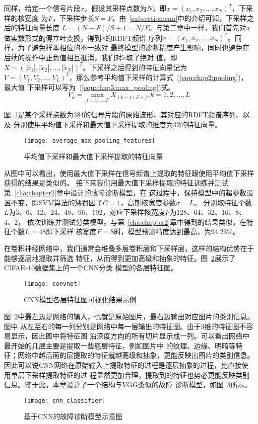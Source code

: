 同样，给定一个信号片段$x$，假设其采样点数为$N$，即$x = (x_1,x_2,...,x_N)^T$，下采样的核宽度
为$F$，下采样步长$S=F$。由~\ref{subsection:cnn}中的介绍可知，下采样之后的特征向量长度
$L = (N-F)/S+1=N/F$。与第二章中一样，我们首先对$x$做实数形式的傅立叶变换，得到$x$的RDFT频谱
序列$\widetilde{x} = (\widetilde{x}_1, \widetilde{x}_2, ..., \widetilde{x}_N)^T$。同样，为了避免样本相位的不一致对
最终模型的诊断精度产生影响，同时也避免在后续的操作中正负值相互抵消，我们对$\widetilde{x}$取了绝对
值，即$X = (|\widetilde{x}_1|, |\widetilde{x}_2|, ..., |\widetilde{x}_N|)^T$。下采样之后得到的特征向量记为
$V = (V_1, V_2, ..., V_L)^T$，那么参考平均值下采样的计算式~(\ref{equ:chap2:pooling})，最大值
下采样可以写为~(\ref{equ:chap3:max_pooling})式。
\begin{equation}
  \label{equ:chap3:max_pooling}
  V_k = \max_{j=1,...,F}X_{(k-1)F+j}, k=1,2,...,L
\end{equation}

图~\ref{fig:average_max_pooling_features}是某个采样点数为384的信号片段的原始波形、其对应的RDFT频谱序列、以及
分别使用平均值下采样和最大值下采样提取的维度为32的特征向量。
\begin{figure}[ht]
  \centering
  \texttt{[image: average\_max\_pooling\_features]}
  \caption{平均值下采样和最大值下采样提取的特征向量}
  \label{fig:average_max_pooling_features}
\end{figure}

从图中可以看出，使用最大值下采样在信号频谱上提取的特征跟使用平均值下采样获得的结果是类似的。
接下来我们用最大值下采样提取的特征训练并测试第~\ref{cha:chapter2}章中设计的故障诊断模型，在
这过程中，保持模型中的超参数设置不变，即SVM算法的惩罚因子$C=1$，高斯核宽度参数$\sigma=L$。
分别取特征个数$L$为3、6、12、24、48、96、192，对应下采样核宽度$F$为128、64、32、16、8、4、2，
依次训练并测试分类模型。与第~\ref{cha:chapter2}章中得到的结果类似，在特征个数$L=48$即下采样
核宽度$F=8$时，模型预测精度达到最高，为94.23\%。

在卷积神经网络中，我们通常会堆叠多层卷积层和下采样层，这样的结构优势在于能够逐层地提取并筛选
特征，从而得到更加高级和抽象的特征。图~\ref{fig:convnet}展示了CIFAR-10数据集上的一个CNN分类
模型的各层特征图。
\begin{figure}[ht]
  \centering%
  \texttt{[image: convnet]}
  \caption{CNN模型各层特征图可视化结果示例}
  \label{fig:convnet}
\end{figure}

图~\ref{fig:convnet}中最左边是网络的输入，也就是原始图片，最右边输出对应图片的类别信息。图中
从左至右的每一列分别是网络中每一层输出的特征图。由于3维的特征图不容易显示，因此图中将特征图
沿深度方向的所有切片显示成一列。可以看出网络中最开始的几层主要是提取一些底层特征，例如图片中
的纹理、边缘、明暗等特征；网络中越后面的层提取的特征就越高级和抽象，更能反映出图片的类别信息。
因此可以说CNN网络在原始输入上提取特征的过程是逐层抽象的过程，比直接使用单层下采样提取特征的过
程显然更加合理，提取到的特征也势必更能反映类别信息。鉴于此，本章设计了一个结构与VGG类似的故障
诊断模型，如图~\ref{fig:cnn_classifier}所示。
\begin{figure}[ht]
  \centering%
  \texttt{[image: cnn\_classifier]}
  \caption{基于CNN的故障诊断模型示意图}
  \label{fig:cnn_classifier}
\end{figure}

